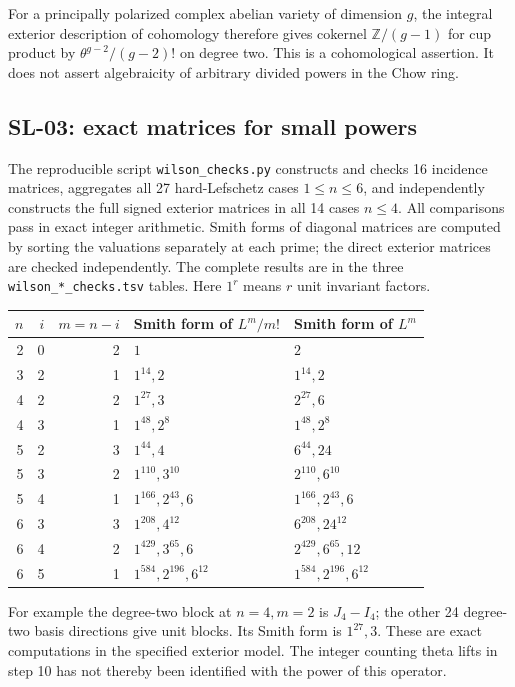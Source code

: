 For a principally polarized complex abelian variety of dimension $g$,
the integral exterior description of cohomology therefore gives cokernel
$\mathbb Z/(g-1)$ for cup product by $\theta^{g-2}/(g-2)!$ on degree
two.  This is a cohomological assertion.  It does not assert algebraicity
of arbitrary divided powers in the Chow ring.

\subsection{SL-03: exact matrices for small powers}
\label{sl:computations}

The reproducible script \texttt{wilson\_checks.py} constructs and checks
16 incidence matrices, aggregates all 27 hard-Lefschetz cases $1\le n\le6$,
and independently constructs the full signed exterior matrices in all 14
cases $n\le4$.  All comparisons pass in exact integer arithmetic.  Smith
forms of diagonal matrices are computed by sorting the valuations separately
at each prime; the direct exterior matrices are checked independently.
The complete results are in the three \texttt{wilson\_*\_checks.tsv}
tables.  Here $1^r$ means $r$ unit invariant factors.

\begin{center}
\begin{tabular}{rrrll}
\toprule
$n$&$i$&$m=n-i$&Smith form of $L^m/m!$&Smith form of $L^m$\\
\midrule
2&0&2&$1$&$2$\\
3&2&1&$1^{14},2$&$1^{14},2$\\
4&2&2&$1^{27},3$&$2^{27},6$\\
4&3&1&$1^{48},2^8$&$1^{48},2^8$\\
5&2&3&$1^{44},4$&$6^{44},24$\\
5&3&2&$1^{110},3^{10}$&$2^{110},6^{10}$\\
5&4&1&$1^{166},2^{43},6$&$1^{166},2^{43},6$\\
6&3&3&$1^{208},4^{12}$&$6^{208},24^{12}$\\
6&4&2&$1^{429},3^{65},6$&$2^{429},6^{65},12$\\
6&5&1&$1^{584},2^{196},6^{12}$&$1^{584},2^{196},6^{12}$\\
\bottomrule
\end{tabular}
\end{center}

For example the degree-two block at $n=4,m=2$ is $J_4-I_4$; the other
24 degree-two basis directions give unit blocks.  Its Smith form is
$1^{27},3$.  These are exact computations in the specified exterior model.
The integer counting theta lifts in step 10 has not thereby been identified
with the power of this operator.

